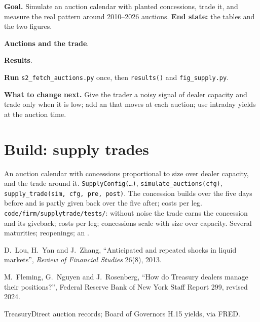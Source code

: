 \begin{tutorial}
\textbf{Goal.} Simulate an auction calendar with planted concessions, trade it, and measure the real pattern around 2010--2026 auctions.
\textbf{End state:} the tables and the two figures.
\begin{tutsteps}
\item \textbf{Auctions and the trade}.
\label{lst:s2:supply-trades:model}
\item \textbf{Results}.
\label{lst:s2:supply-trades:results}
\item \textbf{Run} \texttt{s2\_fetch\_auctions.py} once, then \texttt{results()} and \texttt{fig\_supply.py}.
\end{tutsteps}
\textbf{What to change next.} Give the trader a noisy signal of dealer capacity and trade only when it is low; add an  that moves at
each auction; use intraday yields at the auction time.
\end{tutorial}

\section{Build: supply trades}\label{bld:s2:supply-trades:supplytrade}

\begin{build}
 An auction calendar with concessions proportional to size over dealer capacity, and the trade around it.
 \texttt{SupplyConfig(\dots)}, \texttt{simulate\_auctions(cfg)}, \texttt{supply\_trade(sim, cfg, pre, post)}.
 The concession builds over the five days before and is partly given back over the five after; costs per leg.
 \texttt{code/firm/supplytrade/tests/}: without noise the trade earns the concession and its giveback; costs per leg;
concessions scale with size over capacity.
 Several maturities; reopenings; an .
\end{build}

\begin{omsources}
\item D.~Lou, H.~Yan and J.~Zhang, ``Anticipated and repeated shocks in liquid markets'', \emph{Review of Financial Studies} 26(8), 2013.
\item M.~Fleming, G.~Nguyen and J.~Rosenberg, ``How do Treasury dealers manage their positions?'', Federal Reserve Bank of New York Staff Report 299,
revised 2024.
\item TreasuryDirect auction records; Board of Governors H.15 yields, via FRED.
\end{omsources}

